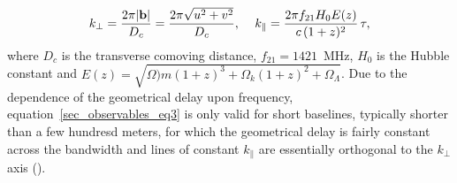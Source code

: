 \begin{equation}
k_\perp = \frac{2 \pi |{\bf b}|}{D_c} = \frac{2 \pi \sqrt{u^2 + v^2}}{D_c}, \,\,\,\,\,\,\,    k_\parallel = \frac{2 \pi f_{21} H_0 E(z)}{c \, (1 + z)^2} \, \tau,
\label{sec_observables_eq4}
\end{equation}
where $D_c$ is the transverse comoving distance, $f_{21} = 1421$~MHz, $H_0$ is the Hubble constant and $E(z) = \sqrt{\Omega)m (1+z)^3 + \Omega_k (1+z)^2 + \Omega_\Lambda}$. Due to the dependence of the geometrical delay upon frequency, equation~\ref{sec_observables_eq3} is only valid for short baselines, typically shorter than a few hundresd meters, for which the geometrical delay is fairly constant across the bandwidth and lines of constant $k_\parallel$ are essentially orthogonal to the $k_\perp$ axis (\cite{parsons12b}).

